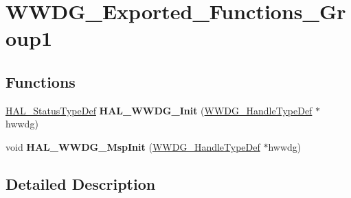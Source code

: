 \hypertarget{group___w_w_d_g___exported___functions___group1}{}\section{W\+W\+D\+G\+\_\+\+Exported\+\_\+\+Functions\+\_\+\+Group1}
\label{group___w_w_d_g___exported___functions___group1}
\subsection*{Functions}
\begin{DoxyCompactItemize}
\item 
\mbox{\label{group___w_w_d_g___exported___functions___group1_ga72706a378ad2f79cba4324c1b328715a}} 
\hyperlink{stm32f0xx__hal__def_8h_a63c0679d1cb8b8c684fbb0632743478f}{H\+A\+L\+\_\+\+Status\+Type\+Def} {\bfseries H\+A\+L\+\_\+\+W\+W\+D\+G\+\_\+\+Init} (\hyperlink{struct_w_w_d_g___handle_type_def}{W\+W\+D\+G\+\_\+\+Handle\+Type\+Def} $\ast$hwwdg)
\item 
\mbox{\label{group___w_w_d_g___exported___functions___group1_ga9871643c1868c37613b89d1acf010cd6}} 
void {\bfseries H\+A\+L\+\_\+\+W\+W\+D\+G\+\_\+\+Msp\+Init} (\hyperlink{struct_w_w_d_g___handle_type_def}{W\+W\+D\+G\+\_\+\+Handle\+Type\+Def} $\ast$hwwdg)
\end{DoxyCompactItemize}


\subsection{Detailed Description}

